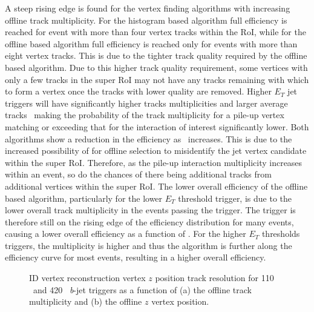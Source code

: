 	A steep rising edge is found for the vertex finding algorithms with increasing offline track multiplicity. For the histogram based algorithm full efficiency is reached for event with more than four vertex tracks within the \ac{RoI}, while for the offline based algorithm full efficiency is reached only for events with more than eight 	vertex tracks.
	This is due to the tighter track quality required by the offline based algorithm. Due to this higher track quality requirement, some vertices with only a few tracks in the super \ac{RoI} may not have any tracks remaining with which to form a vertex once the tracks with lower quality are removed. 
	Higher $E_T$ jet triggers will have significantly higher tracks multiplicities and larger average tracks \pt\, making the probability of the track multiplicity for a pile-up vertex matching or exceeding that for the interaction of interest significantly lower. Both algorithms show a reduction in the efficiency as \mubar\ increases. This is due to the increased possibility of for offline selection to misidentify the jet vertex candidate within the super \ac{RoI}. Therefore, as the pile-up interaction multiplicity increases within an event, so do the chances of there being additional tracks from additional vertices within the super \ac{RoI}.
	 The lower overall efficiency of the offline based algorithm, particularly for the lower $E_T$ threshold trigger, is due to the lower overall track multiplicity in the events passing the trigger. The trigger is therefore still on the rising edge of the efficiency distribution for many events, causing a lower overall efficiency as a function of \mubar. For the higher $E_T$ thresholds triggers, the multiplicity is higher and thus the algorithm is further along the efficiency curve for most events, resulting in a higher overall efficiency. 
		\begin{figure}[!hbt]
	\begin{center}
		\hspace{0.03\textwidth}
			\hspace{0.03\textwidth}
	\end{center}	
	\caption{\ac{ID} vertex reconstruction vertex  $z$  position track resolution for 110 \gev\ and 420 \gev\ \textit{b}-jet triggers as a function of (a) the offline track multiplicity and (b) the offline $z$ vertex position.}
	\label{fig:vertex_idtrig_res}
	\end{figure}		

